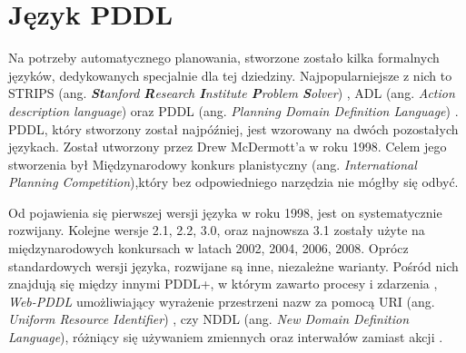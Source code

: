 \section{Język PDDL}
\label{sec:jezykpddl}
Na potrzeby automatycznego planowania, stworzone zostało kilka formalnych języków, dedykowanych specjalnie dla tej dziedziny. Najpopularniejsze z nich to STRIPS (ang. \textit{\textbf{St}anford \textbf{R}esearch \textbf{I}nstitute \textbf{P}roblem \textbf{S}olver}) \cite{strips}, ADL (ang. \textit{Action description language}) \cite{adl} oraz PDDL (ang. \textit{Planning Domain Definition Language}) \cite{pddl}. PDDL, który stworzony został najpóźniej, jest wzorowany na dwóch pozostałych językach. Został utworzony przez Drew McDermott'a w roku 1998. Celem jego stworzenia był Międzynarodowy konkurs planistyczny (ang. \textit{International Planning Competition}),który bez odpowiedniego narzędzia nie mógłby się odbyć.

Od pojawienia się pierwszej wersji języka w roku 1998, jest on systematycznie rozwijany. Kolejne wersje 2.1, 2.2, 3.0, oraz najnowsza 3.1 zostały użyte na międzynarodowych konkursach w latach 2002, 2004, 2006, 2008. Oprócz standardowych wersji języka, rozwijane są inne, niezależne warianty. Pośród nich znajdują się między innymi PDDL+, w którym zawarto procesy i zdarzenia \cite{pddlplus}, \emph{Web-PDDL} umożliwiający wyrażenie przestrzeni nazw za pomocą URI (ang. \textit{Uniform Resource Identifier}) \cite{webpddl}, czy NDDL (ang. \textit{New Domain Definition Language}), różniący się używaniem zmiennych oraz interwałów zamiast akcji \cite{npdl}.

